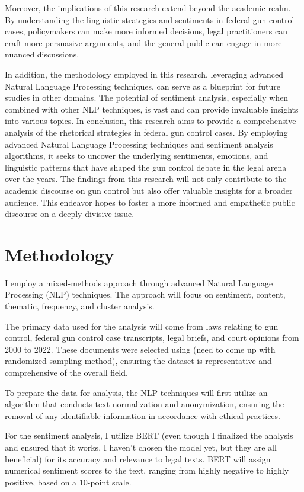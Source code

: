 \documentclass[conference]{IEEEtran}
\begin{document}
Moreover, the implications of this research extend beyond the academic realm. By understanding the linguistic strategies and sentiments in federal gun control cases, policymakers can make more informed decisions, legal practitioners can craft more persuasive arguments, and the general public can engage in more nuanced discussions.

In addition, the methodology employed in this research, leveraging advanced Natural Language Processing techniques, can serve as a blueprint for future studies in other domains. The potential of sentiment analysis, especially when combined with other NLP techniques, is vast and can provide invaluable insights into various topics. In conclusion, this research aims to provide a comprehensive analysis of the rhetorical strategies in federal gun control cases. By employing advanced Natural Language Processing techniques and sentiment analysis algorithms, it seeks to uncover the underlying sentiments, emotions, and linguistic patterns that have shaped the gun control debate in the legal arena over the years. The findings from this research will not only contribute to the academic discourse on gun control but also offer valuable insights for a broader audience. This endeavor hopes to foster a more informed and empathetic public discourse on a deeply divisive issue.

\section{Methodology}
I employ a mixed-methods approach through advanced Natural Language Processing (NLP) techniques. The approach will focus on sentiment, content, thematic, frequency, and cluster analysis.

The primary data used for the analysis will come from laws relating to gun control, federal gun control case transcripts, legal briefs, and court opinions from 2000 to 2022. These documents were selected using (need to come up with randomized sampling method), ensuring the dataset is representative and comprehensive of the overall field.

To prepare the data for analysis, the NLP techniques will first utilize an algorithm that conducts text normalization and anonymization, ensuring the removal of any identifiable information in accordance with ethical practices.

For the sentiment analysis, I utilize BERT (even though I finalized the analysis and ensured that it works, I haven't chosen the model yet, but they are all beneficial) for its accuracy and relevance to legal texts. BERT will assign numerical sentiment scores to the text, ranging from highly negative to highly positive, based on a 10-point scale. 
\end{document}
